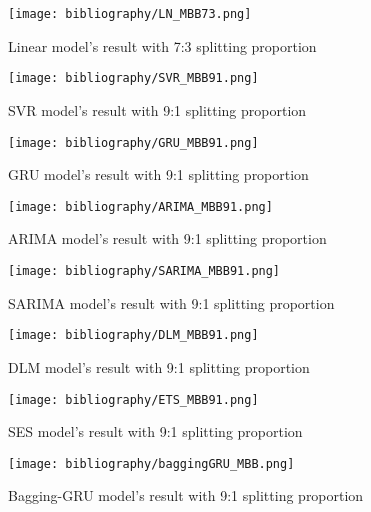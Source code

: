\documentclass{ieeeojies}
\begin{document}
\begin{figure}[H]
  \centering
  \begin{minipage}{0.8\linewidth}
    \centering
    \texttt{[image: bibliography/LN\_MBB73.png]}
    \caption{Linear model's result with 7:3 splitting proportion}
    \label{fig15}
  \end{minipage}
\end{figure}
\begin{figure}[H]
  \centering
  \begin{minipage}{0.8\linewidth}
    \centering
    \texttt{[image: bibliography/SVR\_MBB91.png]}
    \caption{SVR model's result with 9:1 splitting proportion}
    \label{fig16}
  \end{minipage}
\end{figure}
\begin{figure}[H]
  \centering
  \begin{minipage}{0.8\linewidth}
    \centering
    \texttt{[image: bibliography/GRU\_MBB91.png]}
    \caption{GRU model's result with 9:1 splitting proportion}
    \label{fig17}
  \end{minipage}
\end{figure}
\begin{figure}[H]
  \centering
  \begin{minipage}{0.8\linewidth}
    \centering
    \texttt{[image: bibliography/ARIMA\_MBB91.png]}
    \caption{ARIMA model's result with 9:1 splitting proportion}
    \label{fig18}
  \end{minipage}
\end{figure}
\begin{figure}[H]
  \centering
  \begin{minipage}{0.8\linewidth}
    \centering
    \texttt{[image: bibliography/SARIMA\_MBB91.png]}
    \caption{SARIMA model's result with 9:1 splitting proportion}
    \label{fig19}
  \end{minipage}
\end{figure}
\begin{figure}[H]
  \centering
  \begin{minipage}{0.8\linewidth}
    \centering
    \texttt{[image: bibliography/DLM\_MBB91.png]}
    \caption{DLM model's result with 9:1 splitting proportion}
    \label{fig20}
  \end{minipage}
\end{figure}
\begin{figure}[H]
  \centering
  \begin{minipage}{0.8\linewidth}
    \centering
    \texttt{[image: bibliography/ETS\_MBB91.png]}
    \caption{SES model's result with 9:1 splitting proportion}
    \label{fig21}
  \end{minipage}
\end{figure}
\begin{figure}[H]
  \centering
  \begin{minipage}{0.8\linewidth}
    \centering
    \texttt{[image: bibliography/baggingGRU\_MBB.png]}
    \caption{Bagging-GRU model's result with 9:1 splitting proportion}
    \label{mbbbggg}
  \end{minipage}
\end{figure}
\end{document}
